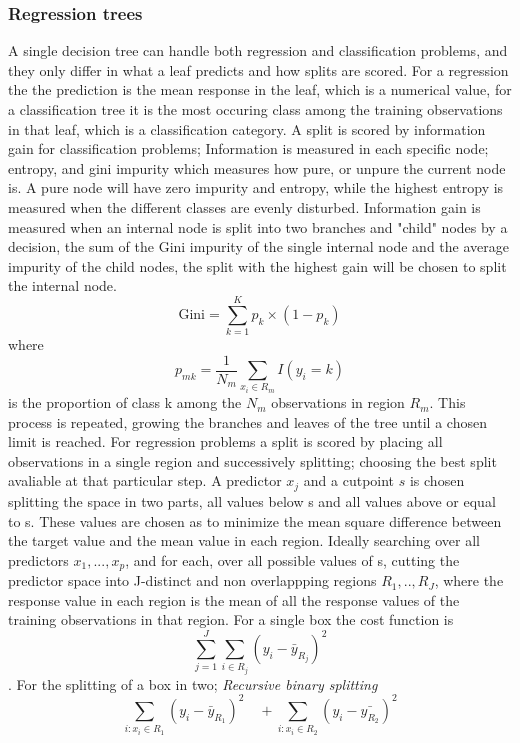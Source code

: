 \subsubsection{Regression trees}
A single decision tree can handle both regression
and classification problems, and they only differ in what a leaf
predicts and how splits are scored. For a regression the the prediction
is the mean response in the leaf, which is a numerical value, for a classification tree it is
the most occuring class among the training observations in that leaf, which is a classification category.  
A split is scored by information gain for classification problems;
Information is measured in each specific node; entropy, and gini impurity
which measures how pure, or unpure the current node is. A pure node
will have zero impurity and entropy, while the highest entropy is measured
when the different classes are evenly disturbed. Information gain is measured
when an internal node is split into two branches and "child" nodes by a decision, 
the sum of the Gini impurity of the single internal node and the average 
impurity of the child nodes, the split with the highest gain will be chosen to 
split the internal node. 
\begin{equation}
    \text{Gini} = \sum_{k=1}^{K} p_k \times (1 - p_k)
    \label{eq:Gini}
\end{equation}
where $$p_{mk} = \frac{1}{N_m}\sum_{x_i \in R_m} I(y_i = k)$$
is the proportion of class k among the $N_m$ observations in
region $R_m$.
This process is repeated, growing the 
branches and leaves of the tree until a chosen limit is reached.  
For regression problems a split is scored by placing all observations
in a single region and successively splitting; choosing the best split
avaliable at that particular step.  
A predictor $x_j$ and a cutpoint $s$ is chosen splitting the space in two parts,
all values below s and all values above or equal to s. These values
are chosen as to minimize the mean square difference between the target
value and the mean value in each region. Ideally searching over all predictors $x_1, ..., x_p$,
and for each, over all possible values of s, cutting the predictor space
into J-distinct and non overlappping regions $R_1, .., R_J$, where the response
value in each region is the mean of all the response values of the training
observations in that region. For a single box the cost function is
$$\sum_{j=1}^{J}\sum_{i \in R_j}(y_i - \bar{y}_{R_j})^2$$. 
For the splitting of a box in two; \textit{Recursive binary splitting}
$$\sum_{i:x_i \in R_1} (y_i - \bar{y}_{R_1})^2 \quad + \sum_{i:x_i \in R_2}(y_i - \bar{y_{R_2}})^2$$
